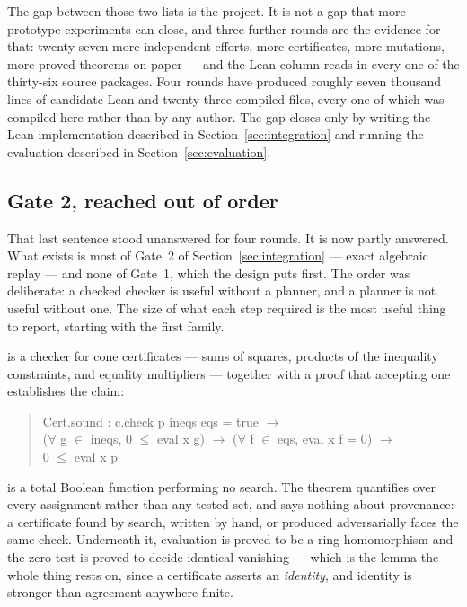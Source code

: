 The gap between those two lists is the project. It is not a gap that more
prototype experiments can close, and three further rounds are the evidence for
that: twenty-seven more independent efforts, more certificates, more mutations,
more proved theorems on paper --- and the Lean column reads  in
every one of the thirty-six source packages. Four rounds have produced roughly
seven thousand lines of candidate Lean and twenty-three compiled files, every one of
which was compiled here rather than by any author. The gap closes only by
writing the Lean implementation described in Section~\ref{sec:integration} and
running the evaluation described in Section~\ref{sec:evaluation}.

\subsection{Gate 2, reached out of order}

That last sentence stood unanswered for four rounds. It is now partly answered.
What exists is most of Gate~2 of Section~\ref{sec:integration} --- exact
algebraic replay --- and none of Gate~1, which the design puts first. The order
was deliberate: a checked checker is useful without a planner, and a planner is
not useful without one. The size of what each step required is the most useful
thing to report, starting with the first family.

 is a checker for cone certificates --- sums of squares,
products of the inequality constraints, and equality multipliers --- together
with a proof that accepting one establishes the claim:

\begin{quote}\small\ttfamily
Cert.sound : c.check p ineqs eqs = true $\to$\\
\hphantom{Cert.sound : }($\forall$ g $\in$ ineqs, 0 $\le$ eval x g) $\to$
($\forall$ f $\in$ eqs, eval x f = 0) $\to$\\
\hphantom{Cert.sound : }0 $\le$ eval x p
\end{quote}

 is a total Boolean function performing no search. The theorem
quantifies over every assignment rather than any tested set, and says nothing
about provenance: a certificate found by search, written by hand, or produced
adversarially faces the same check. Underneath it, evaluation is proved to be a
ring homomorphism and the zero test is proved to decide identical vanishing ---
which is the lemma the whole thing rests on, since a certificate asserts an
\emph{identity}, and identity is stronger than agreement anywhere finite.

